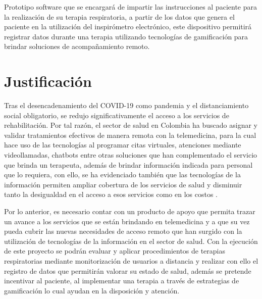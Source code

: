 \documentclass[12pt]{article}
\begin{document}
Prototipo software que se encargar\'a de impartir las instrucciones al paciente para la realizaci\'on de su terapia respiratoria, a partir de los datos que genera el paciente en la utilizaci\'on del inspir\'ometro electr\'onico, este dispositivo permitir\'a registrar datos durante una terapia utilizando tecnolog\'ias de gamificaci\'on para brindar soluciones de acompa\~{n}amiento remoto. 




\newpage






\section{Justificación}

Tras el desencadenamiento del COVID-19 como pandemia y el distanciamiento social obligatorio, se redujo significativamente el acceso a los servicios de rehabilitaci\'on. Por tal raz\'on, el sector de salud en Colombia ha buscado asignar y validar tratamientos efectivos de manera remota con la telemedicina, para la cual hace uso de las tecnolog\'ias al programar citas virtuales, atenciones mediante videollamadas, chatbots entre otras soluciones que han complementado el servicio que brinda un terapeuta, adem\'as de brindar informaci\'on indicada para personal que lo requiera, con ello, se  ha evidenciado tambi\'en que las tecnolog\'ias de la informaci\'on permiten ampliar cobertura de los servicios de salud y disminuir tanto la desigualdad en el acceso a esos servicios como en los costos \cite{11}.

Por lo anterior, es necesario contar con un producto de apoyo que permita trazar un avance a los servicios que se est\'an brindando en telemedicina y a que su vez pueda cubrir las nuevas necesidades de acceso remoto que han surgido con la utilizaci\'on de tecnolog\'ias de la informaci\'on en el sector de salud. Con la ejecuci\'on de este proyecto se podr\'an evaluar y aplicar procedimientos de terapias respiratorias mediante monitorizaci\'on de usuarios a distancia y realizar con ello el registro de datos que permitir\'an valorar su estado de salud, adem\'as se pretende incentivar al paciente, al  implementar una terapia a trav\'es de estrategias de gamificaci\'on lo cual ayudan en la disposici\'on y atenci\'on. 
\end{document}

